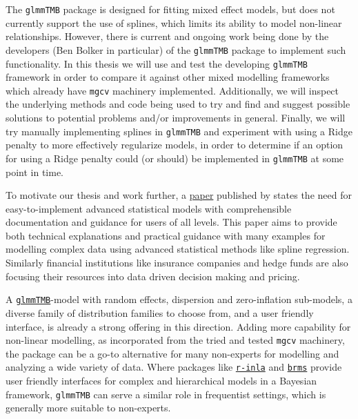 \documentclass[12pt, twoside,hidelinks]{article}
\theoremstyle{definition}
\numberwithin{equation}{section}
\begin{document}
The \texttt{glmmTMB} \citep{GlmmTMB2017} package is designed for fitting mixed effect models, but does not currently support the use of splines, which limits its ability to model non-linear relationships. However, there is current and ongoing work being done by the developers (Ben Bolker in particular) of the \texttt{glmmTMB} package to implement such functionality. In this thesis we will use and test the developing \texttt{glmmTMB} framework in order to compare it against other mixed modelling frameworks which already have \texttt{mgcv} machinery implemented. Additionally, we will inspect the underlying methods and code being used to try and find and suggest possible solutions to potential problems and/or improvements in general. Finally, we will try manually implementing splines in \texttt{glmmTMB} and experiment with using a Ridge penalty to more effectively regularize models, in order to determine if an option for using a Ridge penalty could (or should) be implemented in \texttt{glmmTMB} at some point in time.
\newline

To motivate our thesis and work further, a \href{https://pubmed.ncbi.nlm.nih.gov/35073384/}{paper} published by \citet{Wallisch2022} states the need for easy-to-implement advanced statistical models with comprehensible documentation and guidance for users of all levels. This paper aims to provide both technical explanations and practical guidance with many examples for modelling complex data using advanced statistical methods like spline regression. Similarly financial institutions like insurance companies and hedge funds are also focusing their resources into data driven decision making and pricing.
\newline

A \href{https://github.com/glmmTMB/glmmTMB}{\texttt{glmmTMB}}-model with random effects, dispersion and zero-inflation sub-models, a diverse family of distribution families to choose from, and a user friendly interface, is already a strong offering in this direction. Adding more capability for non-linear modelling, as incorporated from the tried and tested \texttt{mgcv} machinery, the package can be a go-to alternative for many non-experts for modelling and analyzing a wide variety of data. Where packages like \href{https://www.r-inla.org/}{\texttt{r-inla}} and \href{https://paul-buerkner.github.io/brms/}{\texttt{brms}} provide user friendly interfaces for complex and hierarchical models in a Bayesian framework, \texttt{glmmTMB} can serve a similar role in frequentist settings, which is generally more suitable to non-experts. 
\newline
\end{document}
